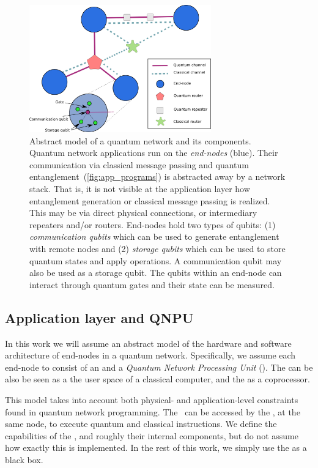 \begin{figure}[h]
    \centering
    \includegraphics[width=0.7\textwidth]{figures/netqasm/network_model.png}
    \caption{Abstract model of a quantum network and its components. Quantum
        network applications run on the \emph{end-nodes} (blue). Their
        communication via classical message passing and quantum
        entanglement~(\cref{fig:app_programs}) is abstracted away by a network
        stack. That is, it is not visible at the application layer how
        entanglement generation or classical message passing is realized. This
        may be via direct physical connections, or intermediary repeaters and/or
        routers. End-nodes hold two types of qubits: (1) \emph{communication
            qubits} which can be used to generate entanglement with remote nodes and
        (2) \emph{storage qubits} which can be used to store quantum states and
        apply operations. A communication qubit may also be used as a storage
        qubit. The qubits within an end-node can interact through quantum gates
        and their state can be measured.}\label{fig:network_model}
\end{figure}



\subsection{Application layer and QNPU}
\label{sec:abstract_model}

In this work we will assume an abstract model of the hardware and software architecture of end-nodes in a quantum network.
Specifically, we assume each end-node to consist of an \host and a \emph{Quantum Network Processing Unit} (\QNPU).
The \host can be also be seen as a the user space of a classical computer, and the \QNPU as a coprocessor.

This model takes into account both physical- and application-level constraints found in quantum network programming.
The \QNPU\ can be accessed by the \host, at the same node, to execute quantum and classical instructions.
We define the capabilities of the \QNPU, and roughly their internal components, but do not assume how exactly this is implemented.
In the rest of this work, we simply use the \QNPU as a black box.

